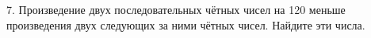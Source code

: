 7. Произведение двух последовательных чётных чисел на 120 меньше произведения двух следующих за ними чётных чисел. Найдите эти числа.\\
